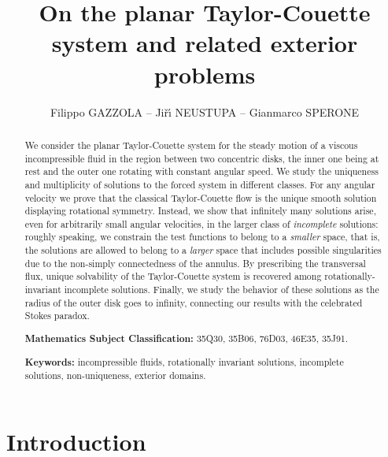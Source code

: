 \documentclass[a4paper,11pt]{article}
\numberwithin{equation}{section}
\numberwithin{figure}{section}
\begin{document}
\title{On the planar Taylor-Couette system and related exterior problems}

\author{Filippo GAZZOLA -- Ji\v{r}\'{\i} NEUSTUPA -- Gianmarco SPERONE}
\date{}
\maketitle
\vspace*{-6mm}

\begin{abstract}
	\noindent
We consider the planar Taylor-Couette system for the steady motion of a viscous incompressible fluid in the region between two concentric disks, the inner one being at rest and the outer one rotating with constant angular speed. We study the uniqueness and multiplicity of solutions to the forced system in different classes. For any angular velocity we prove that the classical Taylor-Couette flow is the unique smooth solution displaying rotational symmetry. Instead, we show that infinitely many solutions arise, even for arbitrarily small angular velocities, in the larger class of \textit{incomplete} solutions: roughly speaking, we constrain the test functions to belong
to a {\em smaller} space, that is, the solutions are allowed to belong to a {\em larger} space that includes possible singularities due to
the non-simply connectedness of the annulus. By prescribing the transversal flux, unique solvability of the Taylor-Couette system is recovered among rotationally-invariant incomplete solutions. Finally, we study the behavior of these solutions as the radius of the outer disk goes to infinity, connecting our results with the celebrated Stokes paradox.
\par
	\noindent
	{\bf Mathematics Subject Classification:} 35Q30, 35B06, 76D03, 46E35, 35J91.\par\noindent
	{\bf Keywords:} incompressible fluids, rotationally invariant solutions, incomplete solutions, non-uniqueness, exterior domains.
\end{abstract}

{
	\hypersetup{linkcolor=black}
	\tableofcontents
}

\section{Introduction}
\end{document}
